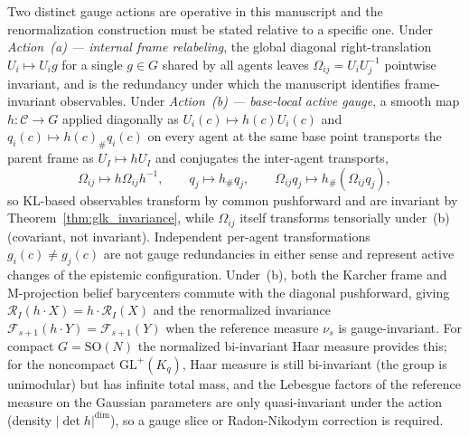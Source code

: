\documentclass[11pt]{article}
\begin{document}
Two distinct gauge actions are operative in this manuscript and the renormalization construction must be stated relative to a specific one. Under \emph{Action~(a) — internal frame relabeling}, the global diagonal right-translation $U_i \mapsto U_i g$ for a single $g \in G$ shared by all agents leaves $\Omega_{ij} = U_i U_j^{-1}$ pointwise invariant, and is the redundancy under which the manuscript identifies frame-invariant observables. Under \emph{Action~(b) — base-local active gauge}, a smooth map $h : \mathcal{C} \to G$ applied diagonally as $U_i(c) \mapsto h(c) U_i(c)$ and $q_i(c) \mapsto h(c)_\# q_i(c)$ on every agent at the same base point transports the parent frame as $U_I \mapsto h U_I$ and conjugates the inter-agent transports,
\begin{equation}
\Omega_{ij} \mapsto h \Omega_{ij} h^{-1}, \qquad q_j \mapsto h_\# q_j, \qquad \Omega_{ij} q_j \mapsto h_\#(\Omega_{ij} q_j),
\end{equation}
so KL-based observables transform by common pushforward and are invariant by Theorem~\ref{thm:glk_invariance}, while $\Omega_{ij}$ itself transforms tensorially under~(b) (covariant, not invariant). Independent per-agent transformations $g_i(c) \neq g_j(c)$ are not gauge redundancies in either sense and represent active changes of the epistemic configuration. Under~(b), both the Karcher frame and M-projection belief barycenters commute with the diagonal pushforward, giving $\mathcal{R}_I(h \cdot X) = h \cdot \mathcal{R}_I(X)$ and the renormalized invariance $\mathcal{F}_{s+1}(h \cdot Y) = \mathcal{F}_{s+1}(Y)$ when the reference measure $\nu_s$ is gauge-invariant. For compact $G = \mathrm{SO}(N)$ the normalized bi-invariant Haar measure provides this; for the noncompact $\mathrm{GL}^+(K_q)$, Haar measure is still bi-invariant (the group is unimodular) but has infinite total mass, and the Lebesgue factors of the reference measure on the Gaussian parameters are only quasi-invariant under the action (density $|\det h|^{\dim}$), so a gauge slice or Radon-Nikodym correction is required.
\end{document}
